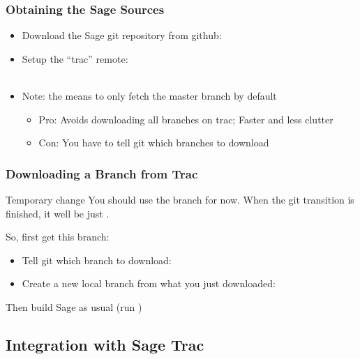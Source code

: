 \begin{frame}
  \frametitle{Obtaining the Sage Sources}
  
  \begin{itemize}
  \item 
    Download the Sage git repository from github:\\
  \item 
    Setup the ``trac'' remote:\\
    {
      \\
      \hfill
    }
  \item Note: the  means to only fetch the master
    branch by default 
    \begin{itemize}
    \item Pro: Avoids downloading all branches on trac; Faster and
      less clutter
    \item Con: You have to tell git which branches to download
    \end{itemize}
  \end{itemize}
\end{frame}




\begin{frame}
  \frametitle{Downloading a Branch from Trac}

   \begin{alertblock}{Temporary change}
     You should use the  branch for
     now. When the git transition is finished, it well be just
     .
   \end{alertblock}
   
   So, first get this branch:
   \begin{itemize}
   \item 
     Tell git which branch to download:\\
   \item 
     Create a new local branch from what you just downloaded:\\
   \end{itemize}

   Then build Sage as usual (run )
\end{frame}


\subsection{Integration with Sage Trac}

